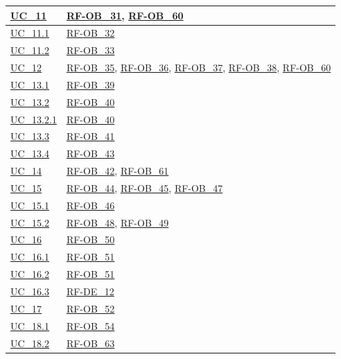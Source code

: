 \begin{longtable}{|>{\raggedright}p{}|>{\raggedright\arraybackslash}p{}|}
    \hline
    \hyperref[uc_11]{UC\_11} & \hyperlink{rf-ob_31}{RF-OB\_31}, \hyperlink{rf-ob_60}{RF-OB\_60} \\
    \hline
    \hyperref[uc_11.1]{UC\_11.1} & \hyperlink{rf-ob_32}{RF-OB\_32} \\
    \hline
    \hyperref[uc_11.2]{UC\_11.2} & \hyperlink{rf-ob_33}{RF-OB\_33} \\
    \hline
    \hyperref[uc_12]{UC\_12} & \hyperlink{rf-ob_35}{RF-OB\_35}, \hyperlink{rf-ob_36}{RF-OB\_36}, \hyperlink{rf-ob_37}{RF-OB\_37}, \hyperlink{rf-ob_38}{RF-OB\_38}, \hyperlink{rf-ob_60}{RF-OB\_60} \\
    \hline
    \hyperref[uc_13.1]{UC\_13.1} & \hyperlink{rf-ob_39}{RF-OB\_39} \\
    \hline
    \hyperref[uc_13.2]{UC\_13.2} & \hyperlink{rf-ob_40}{RF-OB\_40} \\
    \hline
    \hyperref[uc_13.2.1]{UC\_13.2.1} & \hyperlink{rf-ob_40}{RF-OB\_40} \\
    \hline
    \hyperref[uc_13.3]{UC\_13.3} & \hyperlink{rf-ob_41}{RF-OB\_41} \\
    \hline
    \hyperref[uc_13.4]{UC\_13.4} & \hyperlink{rf-ob_43}{RF-OB\_43} \\
    \hline
    \hyperref[uc_14]{UC\_14} & \hyperlink{rf-ob_42}{RF-OB\_42}, \hyperlink{rf-ob_61}{RF-OB\_61} \\
    \hline
    \hyperref[uc_15]{UC\_15} & \hyperlink{rf-ob_44}{RF-OB\_44}, \hyperlink{rf-ob_45}{RF-OB\_45}, \hyperlink{rf-ob_47}{RF-OB\_47} \\
    \hline
    \hyperref[uc_15.1]{UC\_15.1} & \hyperlink{rf-ob_46}{RF-OB\_46} \\
    \hline
    \hyperref[uc_15.2]{UC\_15.2} & \hyperlink{rf-ob_48}{RF-OB\_48}, \hyperlink{rf-ob_49}{RF-OB\_49} \\
    \hline
    \hyperref[uc_16]{UC\_16} & \hyperlink{rf-ob_50}{RF-OB\_50} \\
    \hline
    \hyperref[uc_16.1]{UC\_16.1} & \hyperlink{rf-ob_51}{RF-OB\_51} \\
    \hline
    \hyperref[uc_16.2]{UC\_16.2} & \hyperlink{rf-ob_51}{RF-OB\_51} \\
    \hline
    \hyperref[uc_16.3]{UC\_16.3} & \hyperlink{rf-de_12}{RF-DE\_12} \\
    \hline
    \hyperref[uc_17]{UC\_17} & \hyperlink{rf-ob_52}{RF-OB\_52} \\
    \hline
    \hyperref[uc_18.1]{UC\_18.1} & \hyperlink{rf-ob_54}{RF-OB\_54} \\
    \hline
    \hyperref[uc_18.2]{UC\_18.2} & \hyperlink{rf-ob_63}{RF-OB\_63} \\

\end{longtable}
